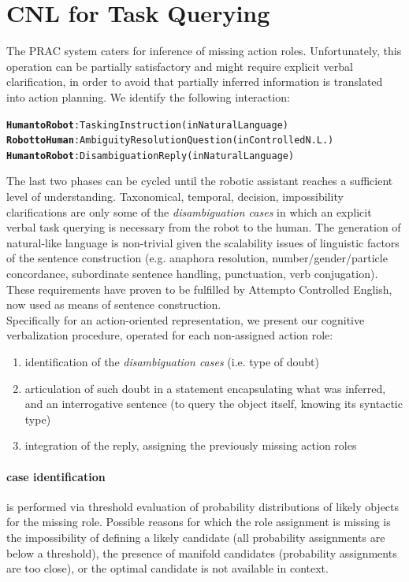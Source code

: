 \documentclass[oribibl]{llncs}
\begin{document}
\section{CNL for Task Querying}
The PRAC system caters for inference of missing action roles. 
Unfortunately, this operation can be partially satisfactory and 
might require explicit verbal clarification, in order to avoid 
that partially inferred information is translated into action planning.
We identify the following interaction:
{\small
\begin{alltt}
\textbf{\color{Red}Human to Robot} : Tasking Instruction           \hfill (in Natural Language)
\textbf{\color{Blue}Robot to Human} : Ambiguity Resolution Question\hfill (in Controlled N. L.)
\textbf{\color{Red}Human to Robot} : Disambiguation Reply          \hfill (in Natural Language)
\end{alltt}
}
The last two phases can be cycled until the robotic assistant reaches a sufficient level of understanding. 
Taxonomical, temporal, decision, impossibility clarifications are only some of the \textit{disambiguation cases} in which an explicit verbal task querying is necessary from the robot to the human. 
The generation of natural-like language is non-trivial given the scalability issues of linguistic factors of the sentence construction (e.g. anaphora resolution, number/gender/particle concordance, subordinate sentence handling, punctuation, verb conjugation). These requirements have proven to be fulfilled by Attempto Controlled English, now used as means of sentence construction.\\
Specifically for an action-oriented representation, we present our cognitive verbalization procedure, operated for each non-assigned action role:

\begin{enumerate} %
    \item identification of the \textit{disambiguation cases}  (i.e. type of doubt)\\
    \item articulation of such doubt in a statement encapsulating what was inferred, and an interrogative sentence (to query the object itself, knowing its syntactic type) \\ 
    \item integration of the reply, assigning the previously missing action roles 
\end{enumerate}

\paragraph{case identification} is performed via threshold evaluation of probability distributions of likely objects for the missing role. 
Possible reasons for which the role assignment is missing is the impossibility of 
defining a likely candidate (all probability assignments are below a threshold), the presence of manifold candidates (probability assignments are too close), or
the optimal candidate is not available in context.  
\end{document}
